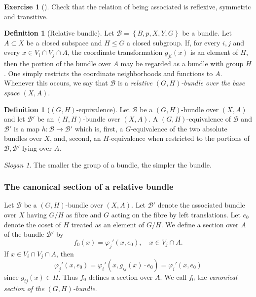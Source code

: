\documentclass[reqno]{amsart}
\theoremstyle{definition}
\newtheorem{definition}[theorem]{Definition}
\newtheorem{exercise}[theorem]{Exercise}
\theoremstyle{remark}
\newtheorem*{slogan}{Slogan}
\begin{document}
    \begin{exercise}[]
        Check that the relation of being associated is
        reflexive, symmetric and transitive.
    \end{exercise}

    \begin{definition}[Relative bundle]
        Let
        $\mathcal{B} = \left\{ B,p,X,Y,G \right\} $ be
        a bundle. Let $A \subset X$ be a closed subspace and
        $H \le G$ a closed subgroup. If, for every
        $i,j$ and every $x \in V_i \cap V_j \cap A$, the
        coordinate transformation $g_{ji}(x)$ is an
        element of $H$, then the portion of the bundle
        over $A$ may be regarded as a bundle with
        group $H$. One simply restricts the coordinate
        neighborhoods and functions to $A$. Whenever
        this occurs, we say that $\mathcal{B}$ is
        a \textit{relative $\left( G,H \right) $-bundle
        over the base space $\left( X,A \right) $}.
    \end{definition}

    \begin{definition}[$(G,H)$-equivalence]
        Let $\mathcal{B}$ be a 
        $\left( G,H \right) $-bundle over
        $(X,A)$ and let
        $\mathcal{B}'$ be an 
        $\left( H,H \right) $-bundle over
        $(X,A)$. A $\left( G,H \right) $-equivalence
        of $\mathcal{B}$ and $\mathcal{B}'$ is a map
        $h \colon \mathcal{B}\to \mathcal{B}'$ which is,
        first, a $G$-equivalence of the two absolute
        bundles over $X$, and, second, an
        $H$-equivalence when restricted to the 
        portions of $\mathcal{B},\mathcal{B}'$ lying over $A$.
    \end{definition}


    \begin{slogan}
        The smaller the group of a bundle, the simpler
        the bundle.
    \end{slogan}

    \subsubsection{The canonical section of
    a relative bundle}

    Let $\mathcal{B}$ be a 
    $\left( G,H \right) $-bundle over
    $(X,A)$. Let
    $\mathcal{B}'$ denote the associated bundle over
    $X$ having $G /H$ as fibre and $G$ acting
    on the fibre by left translations.
    Let $e_0$ denote the coset
    of $H$ treated as an element of $G /H$.
    We define a section over $A$ of the bundle
    $\mathcal{B}'$ by
    \[
    f_0(x) = \varphi_j' (x,e_0), \quad x \in V_j \cap A.
    \] 
    If $x \in V_i \cap V_j \cap A$, then
    \[
    \varphi_j'(x,e_0) = 
    \varphi_i'\left( x, g_{ij}(x) \cdot e_0 \right) 
    = \varphi_i' (x, e_0)
    \] 
    since $g_{ij}(x) \in H$. Thus
    $f_0$ defines a section over $A$.
    We call $f_0$ the \textit{canonical section of the
    $(G,H)$-bundle}.
\end{document}
